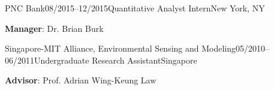 
\begin{rSubsection}{PNC Bank}{08/2015--12/2015}{Quantitative Analyst Intern}{New York, NY}
\item {\bf Manager}: Dr. Brian Burk 
\smallskip
\end{rSubsection}


\begin{rSubsection}{Singapore-MIT Alliance, Environmental Sensing and Modeling}{05/2010--06/2011}{Undergraduate Research Assistant}{Singapore}
\item {\bf Advisor}: Prof. Adrian Wing-Keung Law \smallskip
\end{rSubsection}